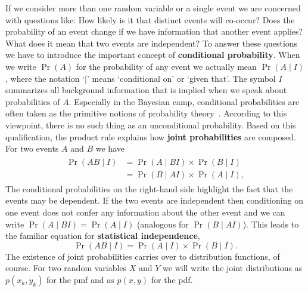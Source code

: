 \documentclass[a4paper]{article}
\newcommand{\prob}[2]{\Pr(#1 \mid #2)}
\begin{document}
If we consider more than one random variable or a single event we are
concerned with questions like: How likely is it that distinct events
will co-occur? Does the probability of an event change if we have
information that another event applies? What does it mean that two
events are independent? To answer these questions we have to introduce
the important concept of \textbf{conditional probability}. When we
write $\Pr(A)$ for the probability of any event we actually mean
$\prob{A}{I}$, where the notation `$\mid$' means `conditional on' or
`given that'. The symbol $I$ summarizes all background information
that is implied when we speak about probabilities of $A$. Especially
in the Bayesian camp, conditional probabilities are often taken as the
primitive notions of probability theory~\citep{jaynes2003,sivia2006}.
According to this viewpoint, there is no such thing as an
unconditional probability. Based on this qualification, the product
rule explains how \textbf{joint probabilities} are composed. For two
events $A$ and $B$ we have
\begin{align}
\label{eq:product}
\begin{split}
\prob{AB}{I} &= \prob{A}{BI} \times \prob{B}{I} \\
&= \prob{B}{AI} \times \prob{A}{I},
\end{split}
\end{align}
The conditional probabilities on the right-hand side highlight the
fact that the events may be dependent. If the two events are
independent then conditioning on one event does not confer any
information about the other event and we can write
$\prob{A}{BI} = \prob{A}{I}$ (analogous for $\prob{B}{AI}$). This
leads to the familiar equation for \textbf{statistical independence},
\begin{equation}
\label{eq:independence}
\prob{AB}{I} = \prob{A}{I} \times \prob{B}{I}.
\end{equation}
The existence of joint probabilities carries over to distribution
functions, of course. For two random variables $X$ and $Y$ we will
write the joint distributions as $p(x_k, y_k)$ for the pmf and as
$p(x,y)$ for the pdf.

\end{document}

